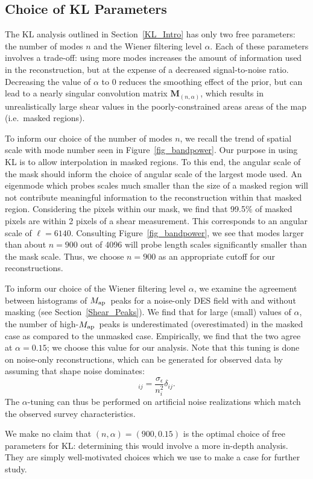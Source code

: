 \documentclass[twocolumn]{emulateapj}
\newcommand{\mymat}[1]{\boldsymbol{#1}}
\newcommand{\Map}{\ensuremath{M_{\rm ap}}\ }
\newcommand{\Noise}{\mymat{\mathcal{N}}}
\begin{document}
\begin{appendix}
\section{Choice of KL Parameters}
\label{Choosing_Params}
The KL analysis outlined in Section~\ref{KL_Intro}
has only two free parameters: the number of
modes $n$ and the Wiener filtering level $\alpha$.  Each of these parameters
involves a trade-off: using more modes increases the amount of information
used in the reconstruction, but at the expense of a decreased signal-to-noise
ratio.  Decreasing the value of $\alpha$ to $0$ reduces the smoothing effect 
of the prior, but can lead to a nearly singular convolution matrix 
$\mymat{M}_{(n,\alpha)}$, 
which results in unrealistically large shear values in the poorly-constrained 
areas areas of the map (i.e.~masked regions).

To inform our choice of the number of modes $n$, we recall the trend of 
spatial scale with mode number seen in Figure~\ref{fig_bandpower}.  Our 
purpose in using KL is to allow interpolation in masked regions.  To this 
end, the angular scale of the mask should inform the choice of angular
scale of the largest mode used.  An eigenmode which probes scales much smaller
than the size of a masked region will not contribute meaningful information to
the reconstruction within that masked region.  Considering the pixels within
our mask, we find that 99.5\% of masked pixels are within 2 pixels of a
shear measurement.  This corresponds to an angular scale of $\ell=6140$.
Consulting Figure~\ref{fig_bandpower}, we see that modes larger than
about $n=900$ out of 4096 will probe length scales significantly 
smaller than the mask scale.  
Thus, we choose $n=900$ as an appropriate cutoff for our reconstructions.

To inform our choice of the Wiener filtering level $\alpha$, we examine the
agreement between histograms of \Map peaks for a noise-only DES field
with and without masking (see Section~\ref{Shear_Peaks}).  
We find that for large (small) values of $\alpha$, the number
of high-\Map peaks is underestimated (overestimated) in the masked 
case as compared to the unmasked case.  
Empirically, we find that the two agree at $\alpha = 0.15$; 
we choose this value for our analysis.  Note that this 
tuning is done on noise-only reconstructions, 
which can be generated for observed data by assuming that
shape noise dominates: 
\begin{equation}
  [\Noise_\gamma]_{ij} = \frac{\sigma_\epsilon}{n_i^2}\delta_{ij}.
\end{equation}
The $\alpha$-tuning can thus be performed on artificial noise realizations 
which match the observed survey characteristics.

We make no claim that $(n,\alpha) = (900,0.15)$ is the optimal
choice of free parameters for KL: determining this would involve a more
in-depth analysis.  They are simply well-motivated choices which we use to
make a case for further study.
\end{appendix}
\end{document}
